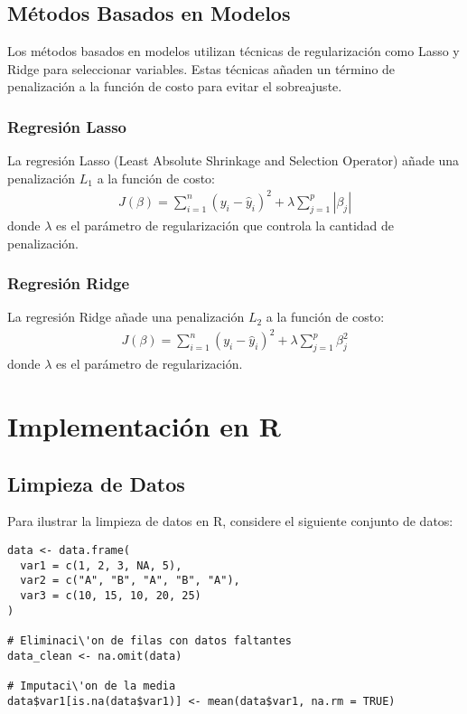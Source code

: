 \subsection{M\'etodos Basados en Modelos}

Los m\'etodos basados en modelos utilizan t\'ecnicas de regularizaci\'on como Lasso y Ridge para seleccionar variables. Estas t\'ecnicas a\~naden un t\'ermino de penalizaci\'on a la funci\'on de costo para evitar el sobreajuste.

\subsubsection{Regresi\'on Lasso}

La regresi\'on Lasso (Least Absolute Shrinkage and Selection Operator) a\~nade una penalizaci\'on $L_1$ a la funci\'on de costo:
\begin{eqnarray*}
J(\beta) = \sum_{i=1}^{n} (y_i - \hat{y}_i)^2 + \lambda \sum_{j=1}^{p} |\beta_j|
\end{eqnarray*}
donde $\lambda$ es el par\'ametro de regularizaci\'on que controla la cantidad de penalizaci\'on.

\subsubsection{Regresi\'on Ridge}

La regresi\'on Ridge a\~nade una penalizaci\'on $L_2$ a la funci\'on de costo:
\begin{eqnarray*}
J(\beta) = \sum_{i=1}^{n} (y_i - \hat{y}_i)^2 + \lambda \sum_{j=1}^{p} \beta_j^2
\end{eqnarray*}
donde $\lambda$ es el par\'ametro de regularizaci\'on.

\section{Implementaci\'on en R}

\subsection{Limpieza de Datos}

Para ilustrar la limpieza de datos en R, considere el siguiente conjunto de datos:
\begin{verbatim}
data <- data.frame(
  var1 = c(1, 2, 3, NA, 5),
  var2 = c("A", "B", "A", "B", "A"),
  var3 = c(10, 15, 10, 20, 25)
)

# Eliminaci\'on de filas con datos faltantes
data_clean <- na.omit(data)

# Imputaci\'on de la media
data$var1[is.na(data$var1)] <- mean(data$var1, na.rm = TRUE)
\end{verbatim}

